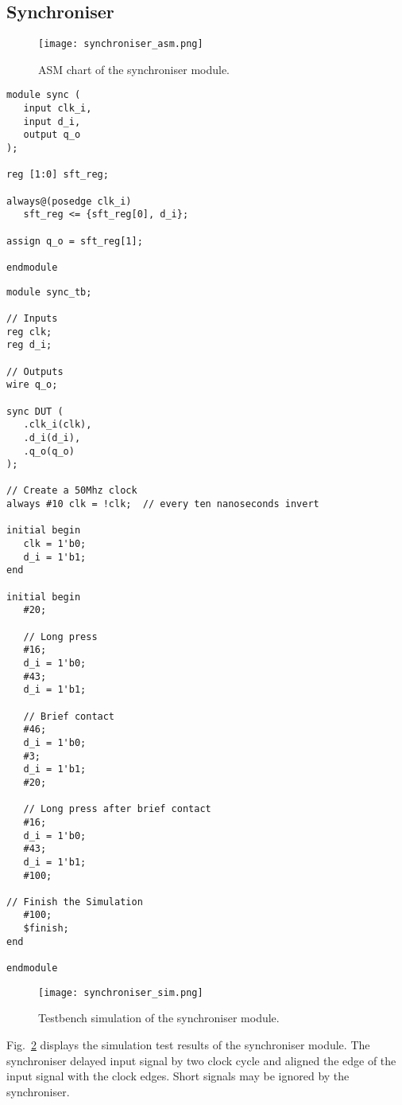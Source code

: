 \subsection{Synchroniser}

\begin{figure}[htbp]
   \centering
   \texttt{[image: synchroniser\_asm.png]}
   \caption{ASM chart of the synchroniser module.}
   \label{fig:synchroniser_asm}
\end{figure}

\begin{verbatim}
module sync (
   input clk_i,
   input d_i,
   output q_o
);

reg [1:0] sft_reg;

always@(posedge clk_i)
   sft_reg <= {sft_reg[0], d_i};

assign q_o = sft_reg[1];

endmodule
\end{verbatim}

\begin{verbatim}
module sync_tb;

// Inputs
reg clk;
reg d_i;

// Outputs
wire q_o;

sync DUT (
   .clk_i(clk),
   .d_i(d_i),
   .q_o(q_o)
);

// Create a 50Mhz clock
always #10 clk = !clk;  // every ten nanoseconds invert

initial begin
   clk = 1'b0;
   d_i = 1'b1;
end

initial begin
   #20;

   // Long press
   #16;
   d_i = 1'b0;
   #43;
   d_i = 1'b1;

   // Brief contact
   #46;
   d_i = 1'b0;
   #3;
   d_i = 1'b1;
   #20;

   // Long press after brief contact
   #16;
   d_i = 1'b0;
   #43;
   d_i = 1'b1;
   #100;

// Finish the Simulation
   #100;
   $finish;
end

endmodule
\end{verbatim}

\begin{figure}[htbp]
   \centerline{
   \texttt{[image: synchroniser\_sim.png]}}
   \caption{Testbench simulation of the synchroniser module.}
   \label{fig:synchroniser_sim}
\end{figure}

Fig.~\ref{fig:synchroniser_sim} displays the simulation test results of the synchroniser module. The synchroniser delayed input signal by two clock cycle and aligned the edge of the input signal with the clock edges. Short signals may be ignored by the synchroniser.
